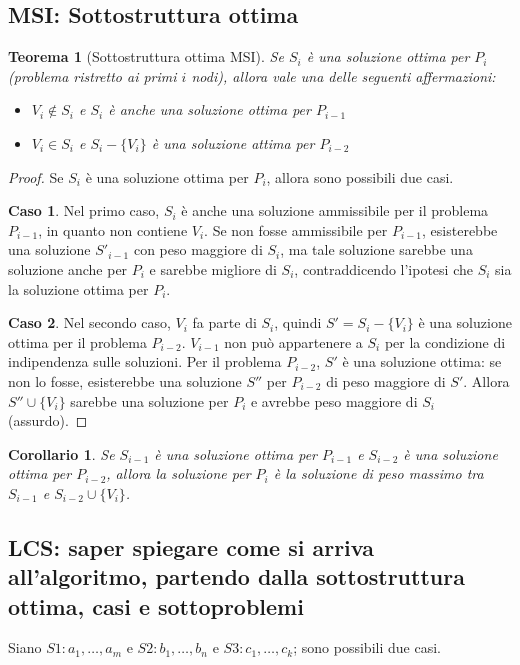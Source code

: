 \documentclass[11pt]{article}
\newtheorem*{theorem}{Teorema}
\newtheorem*{corollary}{Corollario}
\begin{document}
\subsection*{MSI: Sottostruttura ottima}
\begin{theorem}[Sottostruttura ottima MSI]
    Se $S_i$ è una soluzione ottima per $P_i$ (problema ristretto ai primi $i$ nodi), allora vale una delle seguenti affermazioni:
    \begin{itemize}
        \item $V_i \notin S_i$ e $S_i$ è anche una soluzione ottima per $P_{i-1}$
        \item $V_i \in S_i$ e $S_i-\{V_i\}$ è una soluzione attima per $P_{i-2}$
    \end{itemize}
\end{theorem}
\begin{proof}
    Se $S_i$ è una soluzione ottima per $P_i$, allora sono possibili due casi.

    \textbf{Caso 1}. Nel primo caso, $S_i$ è anche una soluzione ammissibile per il problema $P_{i-1}$, in quanto non contiene 
    $V_i$. Se non fosse ammissibile per $P_{i-1}$, esisterebbe una soluzione $S'_{i-1}$ con peso maggiore di $S_i$, ma tale 
    soluzione sarebbe una soluzione anche per $P_i$ e sarebbe migliore di $S_i$, contraddicendo l'ipotesi che $S_i$ sia 
    la soluzione ottima per $P_i$.

    \textbf{Caso 2}. Nel secondo caso, $V_i$ fa parte di $S_i$, quindi $S'=S_i-\{V_i\}$ è una soluzione ottima per il problema 
    $P_{i-2}$. $V_{i-1}$ non può appartenere a $S_i$ per la condizione di indipendenza sulle soluzioni. Per il problema 
    $P_{i-2}$, $S'$ è una soluzione ottima: se non lo fosse, esisterebbe una soluzione $S''$ per $P_{i-2}$ di peso maggiore 
    di $S'$. Allora $S''\cup \{V_i\}$ sarebbe una soluzione per $P_i$ e avrebbe peso maggiore di $S_i$ (assurdo). 
\end{proof}
\begin{corollary}
    Se $S_{i-1}$ è una soluzione ottima per $P_{i-1}$ e $S_{i-2}$ è una soluzione ottima per $P_{i-2}$, allora la soluzione 
    per $P_i$ è la soluzione di peso massimo tra $S_{i-1}$ e $S_{i-2}\cup \{V_i\}$.
\end{corollary}
\subsection*{LCS: saper spiegare come si arriva all'algoritmo, partendo dalla sottostruttura ottima, casi e sottoproblemi}
Siano $S1:a_1,\dots,a_m$ e $S2:b_1,\dots,b_n$ e $S3:c_1,\dots,c_k$; sono possibili due casi.
\end{document}
